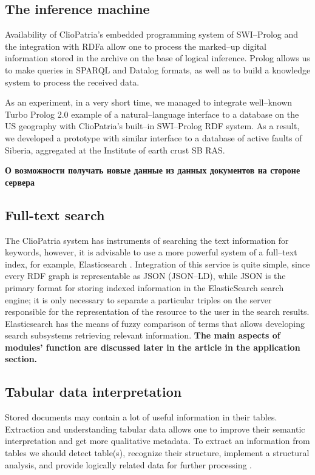 \documentclass[conference,a4paper]{IEEEtran}
\begin{document}
\subsection{The inference machine}

Availability of ClioPatria's embedded programming system of SWI--Prolog \cite{b10} and the integration with RDFa allow one to process the marked--up digital information stored in the archive on the base of logical inference.  Prolog allows us to make queries in SPARQL and Datalog formats, as well as to build a knowledge system to process the received data.

As an experiment, in a very short time, we managed to integrate well--known Turbo Prolog 2.0 example of a natural--language interface to a database on the US geography with ClioPatria's built--in SWI--Prolog RDF system.  As a result, we developed a prototype with similar interface to a database of active faults of Siberia, aggregated at the Institute of earth crust SB RAS.

\textbf{О возможности получать новые данные из данных документов на стороне сервера}

\subsection{Full-text search}

The ClioPatria system has instruments of searching the text information for keywords, however, it is advisable to use a more powerful system of a full--text index, for example, Elasticsearch \cite{b13}.  Integration of this service is quite simple, since every RDF graph is representable as JSON (JSON--LD), while JSON is the primary format for storing indexed information in the ElasticSearch search engine; it is only necessary to separate a particular triples on the server responsible for the representation of the resource to the user in the search results.  Elasticsearch has the means of fuzzy comparison of terms that allows developing search subsystems retrieving relevant information.  \textbf{The main aspects of modules' function are discussed later in the article in the application section.}


\subsection{Tabular data interpretation}

Stored documents may contain a lot of useful information in their tables.  Extraction and understanding tabular data allows one to improve their semantic interpretation and get more qualitative metadata.  To extract an information from tables we should detect table(s), recognize their structure, implement a structural analysis, and provide logically related data for further processing \cite{Shigarov_2017}.
\end{document}

